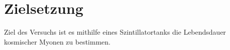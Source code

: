 \section{Zielsetzung}
\label{sec:zielsetzung}

Ziel des Versuchs ist es mithilfe eines Szintillatortanks die Lebendsdauer kosmischer Myonen zu bestimmen.